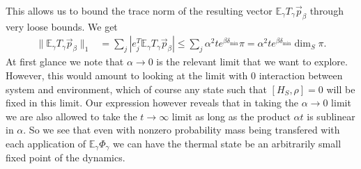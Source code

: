 \documentclass{article}
\newcommand{\abs}[1]{\left| #1 \right|}
\newcommand{\norm}[1]{\| #1 \|}
\newcommand{\EE}{\mathbb{E}}
\DeclareMathOperator{\sinc}{sinc}
\begin{document}
This allows us to bound the trace norm of the resulting vector $\EE_\gamma T_\gamma \vec{p}_\beta$ through very loose bounds. We get
\begin{align}
    \norm{\EE_\gamma T_\gamma \vec{p}_\beta}_1 &= \sum_j \abs{e_j^T \EE_\gamma T_\gamma \vec{p}_\beta } \leq \sum_j \alpha^2 t e^{\beta \delta_{\min}} \pi = \alpha^2 t e^{\beta \delta_{\min}} \dim_S \pi.
\end{align}
At first glance we note that $\alpha \to 0$ is the relevant limit that we want to explore. However, this would amount to looking at the limit with 0 interaction between system and environment, which of course any state such that $[H_S, \rho] = 0$ will be fixed in this limit. Our expression however reveals that in taking the $\alpha \to 0$ limit we are also allowed to take the $t \to \infty$ limit as long as the product $\alpha t$ is sublinear in $\alpha$. So we see that even with nonzero probability mass being transfered with each application of $\EE_\gamma \Phi_\gamma$ we can have the thermal state be an arbitrarily small fixed point of the dynamics. 




\end{document}
